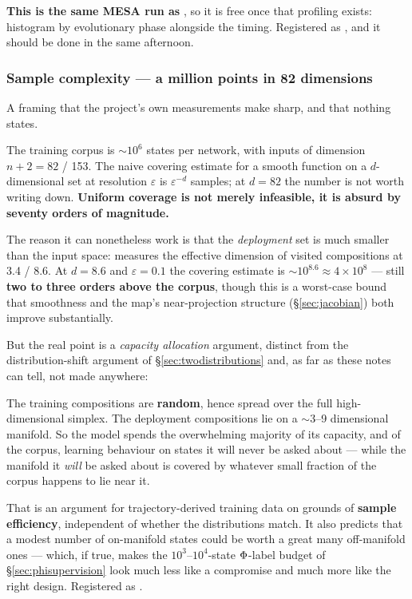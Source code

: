 \textbf{This is the same MESA run as }, so it is free once that
profiling exists: histogram  by evolutionary phase alongside the
 timing. Registered as , and it should be done in the same
afternoon.

\subsubsection{Sample complexity --- a million points in 82 dimensions}
\label{sec:samplecomplexity}

A framing that the project's own measurements make sharp, and that nothing
states.

The training corpus is ${\sim}10^{6}$ states per network, with inputs of
dimension $n + 2 = 82$ / 153. The naive covering estimate for a smooth function
on a $d$-dimensional set at resolution $\varepsilon$ is $\varepsilon^{-d}$
samples; at $d = 82$ the number is not worth writing down. \textbf{Uniform
coverage is not merely infeasible, it is absurd by seventy orders of magnitude.}

The reason it can nonetheless work is that the \emph{deployment} set is much
smaller than the input space:  measures the effective
dimension of visited compositions at 3.4 / 8.6. At $d = 8.6$ and
$\varepsilon = 0.1$ the covering estimate is ${\sim}10^{8.6} \approx 4\times10^{8}$
--- still \textbf{two to three orders above the corpus}, though this is a
worst-case bound that smoothness and the map's near-projection structure
(\S\ref{sec:jacobian}) both improve substantially.

But the real point is a \emph{capacity allocation} argument, distinct from the
distribution-shift argument of \S\ref{sec:twodistributions} and, as far as these
notes can tell, not made anywhere:

\begin{aside}
The training compositions are \textbf{random}, hence spread over the full
high-dimensional simplex. The deployment compositions lie on a ${\sim}3$--9
dimensional manifold. So the model spends the overwhelming majority of its
capacity, and of the corpus, learning behaviour on states it will never be asked
about --- while the manifold it \emph{will} be asked about is covered by
whatever small fraction of the corpus happens to lie near it.
\end{aside}

That is an argument for trajectory-derived training data on grounds of
\textbf{sample efficiency}, independent of whether the distributions match. It
also predicts that a modest number of on-manifold states could be worth a great
many off-manifold ones --- which, if true, makes the $10^{3}$--$10^{4}$-state
$\Phi$-label budget of \S\ref{sec:phisupervision} look much less like a
compromise and much more like the right design. Registered as .

